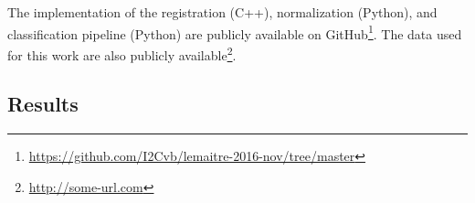 The implementation of the registration (C++), normalization (Python), and classification pipeline (Python) are publicly available on GitHub\footnote{\url{https://github.com/I2Cvb/lemaitre-2016-nov/tree/master}}.
The data used for this work are also publicly available\footnote{\url{http://some-url.com}}.

\subsection{Results}

